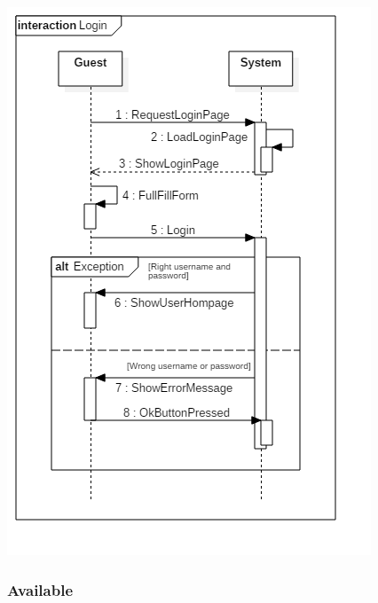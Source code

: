 \documentclass[english]{article}
\begin{document}
\includegraphics[width=\textwidth]{Login}


\subsubsection{Available}
\end{document}
